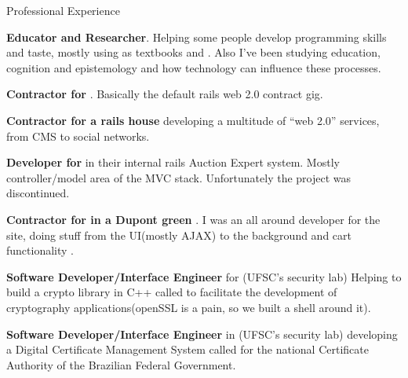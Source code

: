 \begin{rubric}{Professional Experience}{
    

    \entry*[2009]%
        \textbf{Educator and Researcher}. Helping some people develop 
        programming skills and taste, mostly using as textbooks
         and
        .
        Also I've been studying education, cognition and epistemology and how
        technology can influence these processes. 

    \entry*[2009]%
        \textbf{Contractor for
        }. Basically the
        default rails web 2.0 contract gig.

    \entry*[2007 - 2008]%
        \textbf{Contractor for  a rails house} 
        developing a multitude of ``web 2.0'' services, from CMS to social networks.

    \entry*[2007]%
        \textbf{Developer for } 
        in their internal rails Auction Expert system. Mostly controller/model area of
        the MVC stack. Unfortunately the project was discontinued.

    \entry*[2007]%
        \textbf{Contractor for  
        in a Dupont green }.
        I was an all around developer for the site, doing stuff from the
        UI(mostly AJAX) to the background and cart functionality .

    \entry*[2005 - 2007]%
        \textbf{Software Developer/Interface Engineer} for 
        (UFSC's security lab) Helping
        to build a crypto library in C++ called  
        to facilitate the development of cryptography
        applications(openSSL is a pain, so we built a shell around it).

    \entry*[2005 - 2007]%
        \textbf{Software Developer/Interface Engineer} in 
        (UFSC's security lab) developing a
        Digital Certificate Management System  called
         for the national
        Certificate Authority of the Brazilian Federal Government.

        
}\end{rubric}

